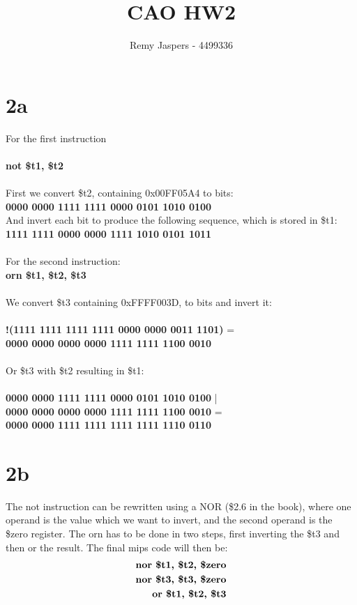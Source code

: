 \documentclass[10pt,a4paper]{article}
\author{Remy Jaspers - 4499336}
\title{CAO HW2}
\begin{document}
	\maketitle
	\section{}
	\section*{2a}
	For the first instruction \\\\ \textbf{not \$t1, \$t2} \\\\ First we convert \$t2, containing 0x00FF05A4 to bits: \\
	
\noindent	\textbf{0000 0000 1111 1111 0000 0101 1010 0100} \\
	
\noindent And invert each bit to produce the following sequence,
which is stored in \$t1: \\
	
\noindent	\textbf{1111 1111 0000 0000 1111 1010 0101 1011} \\\\

\noindent For the second instruction: \\

\noindent \textbf{orn \$t1, \$t2, \$t3} \\\\
\noindent We convert \$t3 containing 0xFFFF003D, to bits and invert it:\\\\
\noindent \textbf{!(1111 1111 1111 1111 0000 0000 0011 1101)} =   \\
\noindent \textbf{0000 0000 0000 0000 1111 1111 1100 0010} \\\\
\noindent Or \$t3 with \$t2 resulting in \$t1: \\\\
\noindent \textbf{0000 0000 1111 1111 0000 0101 1010 0100} | \\
\noindent \textbf{0000 0000 0000 0000 1111 1111 1100 0010} = \\
\noindent \textbf{0000 0000 1111 1111 1111 1111 1110 0110}
\section*{2b}
The not instruction can be rewritten using a NOR (\$2.6 in the book), where one operand is the value which we want to invert, and the second operand is the \$zero register. The orn has to be done in two steps, first inverting the \$t3 and then or the result. The final mips code will then be:\\
\begin{eqnarray}
\noindent \textbf{nor \$t1, \$t2, \$zero} \\
\noindent \textbf{nor \$t3, \$t3, \$zero} \\
\noindent \textbf{or  \$t1, \$t2, \$t3} 
\end{eqnarray}
\end{document}
